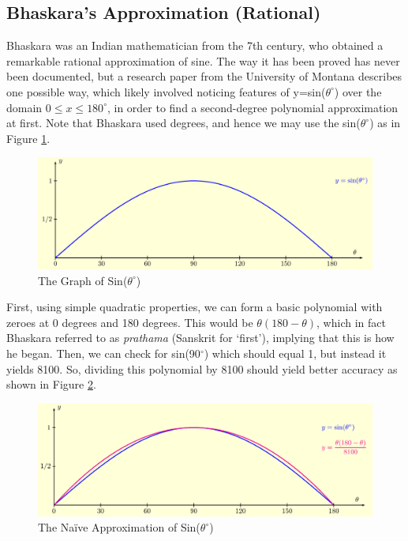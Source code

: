 \documentclass[12pt]{article}
\begin{document}
\subsection{Bhaskara's Approximation (Rational)}
Bhaskara was an Indian mathematician from the 7th century, who obtained a remarkable rational approximation of sine. The way it has been proved has never been documented, but a research paper from the University of Montana describes one possible way, which likely involved noticing features of y=sin($\theta^{\circ}$) over the domain $0\le x\le 180^{\circ}$, in order to find a second-degree polynomial approximation at first. Note that Bhaskara used degrees, and hence we may use the sin($\theta^{\circ}$) as in Figure \ref{fig:sindeg}.

\begin{figure}[h]
    \centering
    \includegraphics[width=0.75\linewidth]{sindegrees.png}
    \caption{The Graph of Sin($\theta^{\circ}$)}
    \label{fig:sindeg}
\end{figure}     

First, using simple quadratic properties, we can form a basic polynomial with zeroes at 0 degrees and 180 degrees. This would be $\theta(180-\theta)$, which in fact Bhaskara referred to as \textit{prathama} (Sanskrit for `first'), implying that this is how he began. Then, we can check for sin(90$^{\circ}$) which should equal 1, but instead it yields 8100. So, dividing this polynomial by 8100 should yield better accuracy as shown in Figure  \ref{fig:sindegA1}.

\begin{figure}[h]
    \centering
    \includegraphics[width=0.75\linewidth]{sindegApprox1.png}
    \caption{The Naïve Approximation of Sin($\theta^{\circ}$)}
    \label{fig:sindegA1}
\end{figure}     
\end{document}
